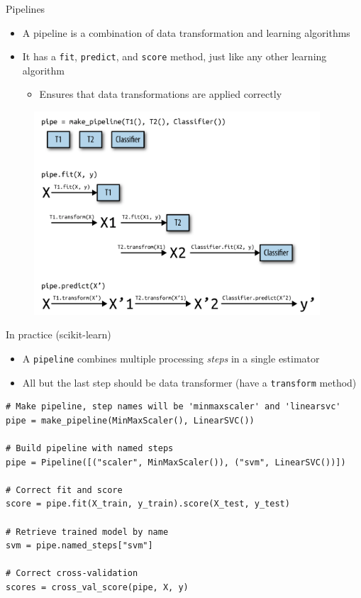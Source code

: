 \begin{frame}[allowframebreaks]{Pipelines}
    \begin{itemize}
        \item A pipeline is a combination of data transformation and learning algorithms
        \item It has a \texttt{fit}, \texttt{predict}, and \texttt{score} method, just like any other learning algorithm
        \begin{itemize}
            \item Ensures that data transformations are applied correctly
        \end{itemize}
    \end{itemize}

    \begin{figure}
        \centering
        \includegraphics[width=0.95\textwidth,keepaspectratio]{images/pre-processing/pipeline.png}
    \end{figure}
\end{frame}

\begin{frame}[fragile]{In practice (scikit-learn)}
\begin{itemize}
    \item A \texttt{pipeline} combines multiple processing \textit{steps} in a single estimator
    \item All but the last step should be data transformer (have a \texttt{transform} method)
\end{itemize}

\vspace{1em}
\scriptsize
\begin{verbatim}
# Make pipeline, step names will be 'minmaxscaler' and 'linearsvc'
pipe = make_pipeline(MinMaxScaler(), LinearSVC())

# Build pipeline with named steps
pipe = Pipeline([("scaler", MinMaxScaler()), ("svm", LinearSVC())])

# Correct fit and score
score = pipe.fit(X_train, y_train).score(X_test, y_test)

# Retrieve trained model by name
svm = pipe.named_steps["svm"]

# Correct cross-validation
scores = cross_val_score(pipe, X, y)
\end{verbatim}
\normalsize
\end{frame}

